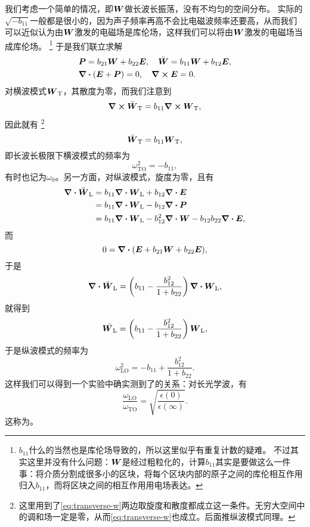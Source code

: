 我们考虑一个简单的情况，即$\vb*{W}$做长波长振荡，没有不均匀的空间分布。
实际的$\sqrt{-b_{11}}$一般都是很小的，因为声子频率再高不会比电磁波频率还要高，从而我们可以近似认为由$\vb*{W}$激发的电磁场是库伦场，这样我们可以将由$\vb*{W}$激发的电磁场当成库伦场。%
\footnote{
    $b_{11}$什么的当然也是库伦场导致的，所以这里似乎有重复计数的疑难。
    不过其实这里并没有什么问题：$\vb*{W}$是经过粗粒化的，计算$b_{11}$其实是要做这么一件事：将介质分割成很多小的区块，将每个区块内部的原子之间的库伦相互作用归入$b_{11}$，而将区块之间的相互作用用电场表达。
}%
于是我们联立求解
\[
    \begin{aligned}
        &\vb*{P} = b_{21} \vb*{W} + b_{22} \vb*{E}, \quad \ddot{\vb*{W}} = b_{11} \vb*{W} + b_{12} \vb*{E}, \\
        &\div(\vb*{E} + \vb*{P}) = 0, \quad \curl{\vb*{E}} = 0.
    \end{aligned}
\]
对横波模式$\vb*{W}_\text{T}$，其散度为零，而我们注意到
\[
    \curl{\ddot{\vb*{W}}_\text{T}} = b_{11} \curl{\vb*{W}_\text{T}},
\]
因此就有%
\footnote{
    这里用到了\eqref{eq:transverse-w}两边取旋度和散度都成立这一条件。无穷大空间中的调和场一定是零，从而\eqref{eq:transverse-w}也成立。后面推纵波模式同理。
}%
\begin{equation}
    \ddot{\vb*{W}}_\text{T} = b_{11} \vb*{W}_\text{T},
    \label{eq:transverse-w}
\end{equation}
即长波长极限下横波模式的频率为
\begin{equation}
    \omega_\text{TO}^2 = - b_{11},
\end{equation}
有时也记为$\omega_0$。另一方面，对纵波模式，旋度为零，且有
\[
    \begin{aligned}
        \div{\ddot{\vb*{W}}_\text{L}} &= b_{11} \div{\vb*{W}_\text{L}} + b_{12} \div{\vb*{E}} \\
        &= b_{11} \div{\vb*{W}_\text{L}} - b_{12} \div{\vb*{P}} \\
        &= b_{11} \div{\vb*{W}_\text{L}} - b_{12}^2 \div{\vb*{W}} - b_{12} b_{22} \div{\vb*{E}},
    \end{aligned}
\]
而
\[
    0 = \div{(\vb*{E} + b_{21} \vb*{W} + b_{22} \vb*{E})},
\]
于是
\[
    \div{\ddot{\vb*{W}}_\text{L}} = \left( b_{11} - \frac{b_{12}^2}{1 + b_{22}} \right) \div{\vb*{W}_\text{L}},
\]
就得到
\begin{equation}
    \ddot{\vb*{W}_\text{L}} = \left( b_{11} - \frac{b_{12}^2}{1 + b_{22}} \right) \vb*{W}_\text{L},
\end{equation}
于是纵波模式的频率为
\begin{equation}
    \omega_\text{LO}^2 = -b_{11} + \frac{b_{12}^2}{1 + b_{22}}.
\end{equation}
这样我们可以得到一个实验中确实测到了的关系：对长光学波，有
\begin{equation}
    \frac{\omega_\text{LO}}{\omega_\text{TO}} = \sqrt{\frac{\epsilon(0)}{\epsilon(\infty)}}.
\end{equation}
这称为。

